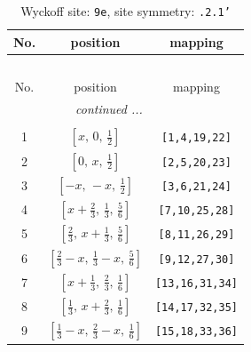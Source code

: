 \documentclass[fleqn,8pt]{jsarticle}
\begin{document}
\begin{longtable}{ccc}
\caption{Wyckoff site: {\tt 9e}, site symmetry: {\tt .2.1'}}
 \\
 \hline \hline
No. & position & mapping \\ \hline \endfirsthead

\multicolumn{2}{l}{\tablename\ \thetable{}} \\
 \hline \hline
No. & position & mapping \\ \hline \endhead

 \hline \hline
\multicolumn{2}{r}{\footnotesize\it continued ...} \\ \endfoot

 \hline \hline
\multicolumn{2}{r}{} \\ \endlastfoot

1 & $\left[ x,\, 0,\, \frac{1}{2} \right]$ & {\tt [1,4,19,22]} \\ \hline
2 & $\left[ 0,\, x,\, \frac{1}{2} \right]$ & {\tt [2,5,20,23]} \\ \hline
3 & $\left[ - x,\, - x,\, \frac{1}{2} \right]$ & {\tt [3,6,21,24]} \\ \hline
4 & $\left[ x + \frac{2}{3},\, \frac{1}{3},\, \frac{5}{6} \right]$ & {\tt [7,10,25,28]} \\ \hline
5 & $\left[ \frac{2}{3},\, x + \frac{1}{3},\, \frac{5}{6} \right]$ & {\tt [8,11,26,29]} \\ \hline
6 & $\left[ \frac{2}{3} - x,\, \frac{1}{3} - x,\, \frac{5}{6} \right]$ & {\tt [9,12,27,30]} \\ \hline
7 & $\left[ x + \frac{1}{3},\, \frac{2}{3},\, \frac{1}{6} \right]$ & {\tt [13,16,31,34]} \\ \hline
8 & $\left[ \frac{1}{3},\, x + \frac{2}{3},\, \frac{1}{6} \right]$ & {\tt [14,17,32,35]} \\ \hline
9 & $\left[ \frac{1}{3} - x,\, \frac{2}{3} - x,\, \frac{1}{6} \right]$ & {\tt [15,18,33,36]} \\
\end{longtable}
\renewcommand{\arraystretch}{1.2}
\end{document}
